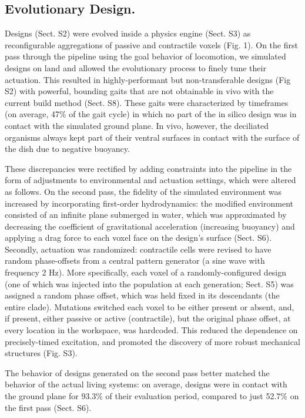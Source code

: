 \subsection*{Evolutionary Design.}  

Designs (Sect. S2) were evolved inside a physics engine (Sect. S3) as reconfigurable aggregations of passive and contractile voxels (Fig. 1). On the first pass through the pipeline using the goal behavior of locomotion, we simulated designs on land and allowed the evolutionary process to finely tune their actuation. This resulted in highly-performant but non-transferable designs (Fig S2) with powerful, bounding gaits that are not obtainable in vivo with the current build method (Sect. S8). These gaits were characterized by timeframes (on average, 47\% of the gait cycle) in which no part of the in silico design was in contact with the simulated ground plane. In vivo, however, the deciliated organisms always kept part of their ventral surfaces in contact with the surface of the dish due to negative buoyancy.

These discrepancies were rectified by adding constraints into the pipeline in the form of adjustments to environmental and actuation settings, which were altered as follows. On the second pass, the fidelity of the simulated environment was increased by incorporating first-order hydrodynamics: the modified environment consisted of an infinite plane submerged in water, which was approximated by decreasing the coefficient of gravitational acceleration (increasing buoyancy) and applying a drag force to each voxel face on the design's surface (Sect. S6). 
Secondly, actuation was randomized: contractile cells were revised to have random phase-offsets from a central pattern generator (a sine wave with frequency 2 Hz). More specifically, each voxel of a randomly-configured design (one of which was injected into the population at each generation; Sect. S5) was assigned a random phase offset, which was held fixed in its descendants (the entire clade). Mutations switched each voxel to be either present or absent, and, if present, either passive or active (contractile), but the original phase offset, at every location in the workspace, was hardcoded. This reduced the dependence on precisely-timed excitation, and promoted the discovery of more robust mechanical structures (Fig. S3).

The behavior of designs generated on the second pass better matched the behavior of the actual living systems: on average, designs were in contact with the ground plane for 93.3\% of their evaluation period, compared to just 52.7\% on the first pass (Sect. S6).

